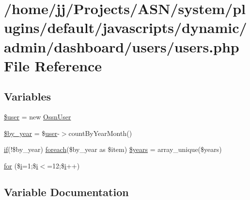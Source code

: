 \hypertarget{javascripts_2dynamic_2admin_2dashboard_2users_2users_8php}{}\section{/home/jj/\+Projects/\+A\+S\+N/system/plugins/default/javascripts/dynamic/admin/dashboard/users/users.php File Reference}
\label{javascripts_2dynamic_2admin_2dashboard_2users_2users_8php}
\subsection*{Variables}
\begin{DoxyCompactItemize}
\item 
\hyperlink{javascripts_2dynamic_2admin_2dashboard_2users_2users_8php_a598ca4e71b15a1313ec95f0df1027ca5}{\$user} = new \hyperlink{class_ossn_user}{Ossn\+User}
\item 
\hyperlink{javascripts_2dynamic_2admin_2dashboard_2users_2users_8php_a2b2efc88287b1f05c027d242f4a2cdb7}{\$by\+\_\+year} = \$\hyperlink{ossn_8config_8db_8example_8php_a802544b7ba9f79bbf24ef67773d53bed}{user}-\/$>$count\+By\+Year\+Month()
\item 
\hyperlink{jquery_8tokeninput_8js_ad8dd46a3cbc004569e34401e9e71771a}{if}(!\$by\+\_\+year) \hyperlink{user__timeline_8php_a1b18c909b5f0affc85267f294d947c4b}{foreach}(\$by\+\_\+year as \$item) \hyperlink{javascripts_2dynamic_2admin_2dashboard_2users_2users_8php_a2ba83f94e1cf7fb8fd712de5cb76d7d9}{\$years} = array\+\_\+unique(\$years)
\item 
\hyperlink{javascripts_2dynamic_2admin_2dashboard_2users_2users_8php_aa62c17193adceb6b294f57db304b61c0}{for} (\$\hyperlink{jquery-ui_8min_8js_a83e0f8a79d7f496783fc7527db51773e}{i}=1;\$\hyperlink{jquery-ui_8min_8js_a83e0f8a79d7f496783fc7527db51773e}{i}$<$=12;\$\hyperlink{jquery-ui_8min_8js_a83e0f8a79d7f496783fc7527db51773e}{i}++)
\end{DoxyCompactItemize}


\subsection{Variable Documentation}
